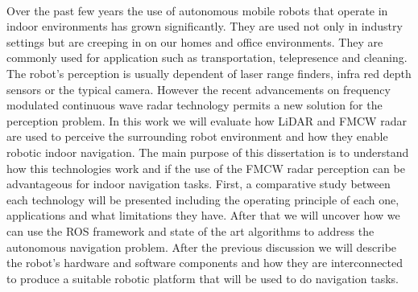        
\EndTitlePage
\titlepage\ \endtitlepage %

\TitlePage
  \vspace*{55mm}
       {Over the past few years the use of autonomous mobile robots that operate in indoor environments has grown significantly. They are used not only in industry settings but are creeping in on our homes and office environments. They are commonly used for application such as transportation, telepresence and cleaning. The robot's perception is usually dependent of laser range finders, infra red depth sensors or the typical camera. However the recent advancements on frequency modulated continuous wave radar technology permits a new solution for the perception problem. In this work we will evaluate how \ac{LiDAR} and \ac{FMCW} \ac{radar} are used to perceive the surrounding robot environment and how they enable robotic indoor navigation. The main purpose of this dissertation is to understand how this technologies work and if the use of the \ac{FMCW} \ac{radar} perception can be advantageous for indoor navigation tasks. 
       }
       \TEXT{}     
       {First, a comparative study between each  technology will be presented including the operating principle of each one, applications and what limitations they have. After that we will uncover how we can use the \ac{ROS} framework and state of the art algorithms  to address the autonomous navigation problem. After the previous discussion we will describe the robot's hardware and software components and how they are interconnected to produce a suitable robotic platform that will be used to do navigation tasks.
        }
